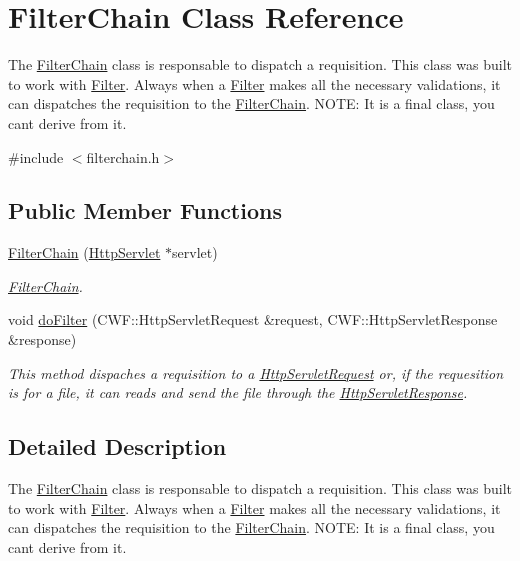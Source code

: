 \hypertarget{class_filter_chain}{}\section{Filter\+Chain Class Reference}
\label{class_filter_chain}


The \hyperlink{class_filter_chain}{Filter\+Chain} class is responsable to dispatch a requisition. This class was built to work with \hyperlink{class_filter}{Filter}. Always when a \hyperlink{class_filter}{Filter} makes all the necessary validations, it can dispatches the requisition to the \hyperlink{class_filter_chain}{Filter\+Chain}. N\+O\+TE\+: It is a final class, you can\textquotesingle{}t derive from it.  




{\ttfamily \#include $<$filterchain.\+h$>$}

\subsection*{Public Member Functions}
\begin{DoxyCompactItemize}
\item 
\hyperlink{class_filter_chain_a2631e4de118e5ea95f1f84c55828b526}{Filter\+Chain} (\hyperlink{class_http_servlet}{Http\+Servlet} $\ast$servlet)
\begin{DoxyCompactList}\small\item\em \hyperlink{class_filter_chain}{Filter\+Chain}. \end{DoxyCompactList}\item 
void \hyperlink{class_filter_chain_a2792dc5418eeb0914af046d78f679d51}{do\+Filter} (C\+W\+F\+::\+Http\+Servlet\+Request \&request, C\+W\+F\+::\+Http\+Servlet\+Response \&response)
\begin{DoxyCompactList}\small\item\em This method dispaches a requisition to a \hyperlink{class_http_servlet_request}{Http\+Servlet\+Request} or, if the requesition is for a file, it can reads and send the file through the \hyperlink{class_http_servlet_response}{Http\+Servlet\+Response}. \end{DoxyCompactList}\end{DoxyCompactItemize}


\subsection{Detailed Description}
The \hyperlink{class_filter_chain}{Filter\+Chain} class is responsable to dispatch a requisition. This class was built to work with \hyperlink{class_filter}{Filter}. Always when a \hyperlink{class_filter}{Filter} makes all the necessary validations, it can dispatches the requisition to the \hyperlink{class_filter_chain}{Filter\+Chain}. N\+O\+TE\+: It is a final class, you can\textquotesingle{}t derive from it. 

